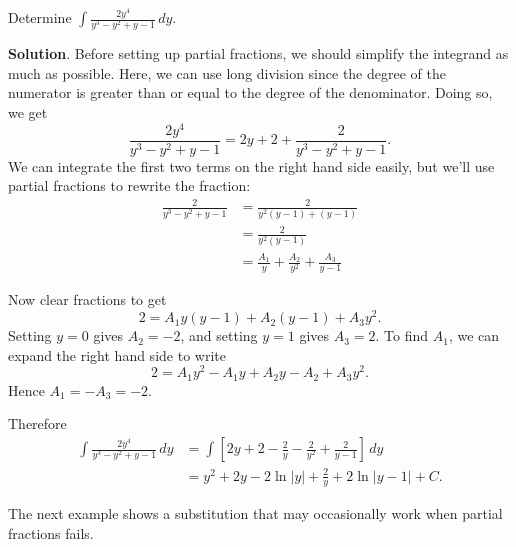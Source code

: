 \documentclass[10pt,]{book}
\theoremstyle{ptxplainnotitle}
\theoremstyle{ptxplaintitle}
\theoremstyle{ptxplainnotitle}
\theoremstyle{ptxplaintitle}
\theoremstyle{ptxplainnotitle}
\theoremstyle{ptxplaintitle}
\theoremstyle{ptxdefinitionnotitle}
\theoremstyle{ptxdefinitiontitle}
\theoremstyle{ptxdefinitionnotitle}
\theoremstyle{ptxdefinitiontitle}
\theoremstyle{ptxdefinitionnotitle}
\theoremstyle{ptxdefinitiontitle}
\theoremstyle{ptxdefinitionnotitle}
\theoremstyle{ptxdefinitiontitle}
\theoremstyle{ptxdefinitionnotitle}
\theoremstyle{ptxdefinitiontitle}
\numberwithin{equation}{section}
\begin{document}
\begin{example}\label{example-using-long-division}
\hypertarget{p-567}{}%
Determine \(\int\frac{2y^{4}}{y^{3} - y^{2} + y - 1}\,dy\).%
\par\smallskip%
\noindent\textbf{Solution}.\hypertarget{solution-124}{}\quad%
\hypertarget{p-568}{}%
Before setting up partial fractions, we should simplify the integrand as much as possible. Here, we can use long division since the degree of the numerator is greater than or equal to the degree of the denominator. Doing so, we get%
\begin{equation*}
\frac{2y^{4}}{y^{3} - y^{2} + y - 1} = 2y + 2 + \frac{2}{y^{3} - y^{2} + y - 1}.
\end{equation*}
We can integrate the first two terms on the right hand side easily, but we'll use partial fractions to rewrite the fraction:%
\begin{align*}
\frac{2}{y^{3} - y^{2} + y - 1} & = \frac{2}{y^{2}(y - 1) + (y - 1)} \\
& = \frac{2}{y^{2}(y - 1)} \\
& = \frac{A_{1}}{y} + \frac{A_{2}}{y^{2}} + \frac{A_{3}}{y - 1} 
\end{align*}
%
\par
\hypertarget{p-569}{}%
Now clear fractions to get%
\begin{equation*}
2 = A_{1}y(y-1) + A_{2}(y-1) + A_{3}y^{2}.
\end{equation*}
Setting \(y = 0\) gives \(A_{2} = -2\), and setting \(y = 1\) gives \(A_{3} = 2\). To find \(A_{1}\), we can expand the right hand side to write%
\begin{equation*}
2 = A_{1}y^{2} - A_{1}y + A_{2}y - A_{2} + A_{3}y^{2}.
\end{equation*}
Hence \(A_{1} = -A_{3} = -2\).%
\par
\hypertarget{p-570}{}%
Therefore%
\begin{align*}
\int\frac{2y^{4}}{y^{3} - y^{2} + y - 1}\,dy & = \int\left[2y + 2 - \frac{2}{y} - \frac{2}{y^{2}} + \frac{2}{y - 1}\right]\,dy  \\
& = y^{2} + 2y - 2\ln|y| + \frac{2}{y} + 2\ln|y-1| + C. 
\end{align*}
%
\end{example}
\hypertarget{p-571}{}%
The next example shows a substitution that may occasionally work when partial fractions fails.%
\end{document}

